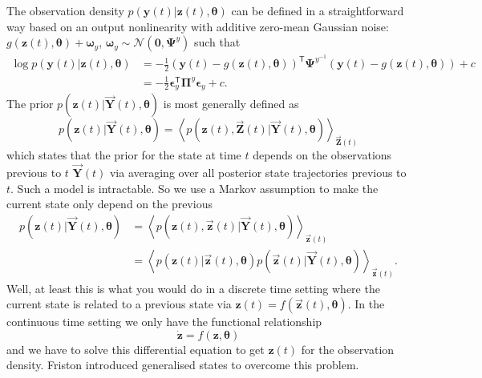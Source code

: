 \documentclass[a4paper,10pt]{article}
\newcommand{\bs}[1]{\mathbf{#1}}					%
\newcommand{\bgs}[1]{\boldsymbol{#1}}				%
\newcommand{\tr}{\mathsf{T}}				%
\newcommand{\eq}[1]{\begin{equation} #1 \end{equation}}%
\renewcommand{\ss}{z}         %
\newcommand{\so}{y}         %
\newcommand{\spe}{\epsilon} %
\renewcommand{\sp}{\theta}    %
\newcommand{\ps}{\bs{\ss}}    %
\newcommand{\po}{\bs{\so}}    %
\newcommand{\ppe}{\bgs{\spe}} %
\newcommand{\pp}{\bgs{\sp}} %
\newcommand{\Ps}{\bs{Z}}    %
\newcommand{\Po}{\bs{Y}}    %
\newcommand{\E}[2][]{\left\langle #2 \right\rangle_{#1}}	%
\newcommand{\N}{\mathcal{N}}			%
\newcommand{\Prec}{\bgs{\Pi}}			%
\begin{document}
The observation density $p(\po(t)|\ps(t),\pp)$ can be defined in a straightforward way based on an output nonlinearity with additive zero-mean Gaussian noise: $g(\ps(t),\pp)+\bgs{\omega}_\so$, $\bgs{\omega}_\so\sim \N(\bs{0},\bgs{\Psi}^\so)$ such that
\begin{align}
    \log p(\po(t)|\ps(t),\pp) &= -\frac{1}{2}(\po(t) - g(\ps(t),\pp))^\tr\bgs{\Psi}^{\so^{-1}}(\po(t) - g(\ps(t),\pp)) + c\\
    &= -\frac{1}{2}\ppe_\so^\tr\Prec^{\so}\ppe_\so + c.
\end{align}
The prior $p(\ps(t)|\vec{\Po}(t),\pp)$ is most generally defined as
\eq{
    p(\ps(t)|\vec{\Po}(t),\pp) = \E[\vec{\Ps}(t)]{p(\ps(t),\vec{\Ps}(t)|\vec{\Po}(t),\pp)}
}
which states that the prior for the state at time $t$ depends on the observations previous to $t$ $\vec{\Po}(t)$ via averaging over all posterior state trajectories previous to $t$. Such a model is intractable. So we use a Markov assumption to make the current state only depend on the previous
\begin{align}
    p(\ps(t)|\vec{\Po}(t),\pp) &= \E[\vec{\ps}(t)]{p(\ps(t),\vec{\ps}(t)|\vec{\Po}(t),\pp)}\\
    &= \label{eq:statePrior} \E[\vec{\ps}(t)]{p(\ps(t)|\vec{\ps}(t),\pp)p(\vec{\ps}(t)|\vec{\Po}(t),\pp)}.
\end{align}
Well, at least this is what you would do in a discrete time setting where the current state is related to a previous state via $\ps(t) = f(\vec{\ps}(t),\pp)$. In the continuous time setting we only have the functional relationship
\eq{
    \dot{\ps} = f(\ps,\pp)
}
and we have to solve this differential equation to get $\ps(t)$ for the observation density. Friston introduced generalised states to overcome this problem. 
\end{document}
